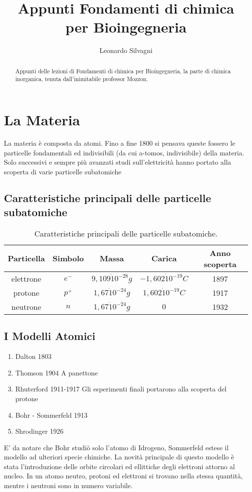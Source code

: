 \documentclass{article}
\title{Appunti Fondamenti di chimica per Bioingegneria}
\author{Leonardo Silvagni}
\begin{document}
\maketitle

\begin{abstract}
Appunti delle lezioni di Fondamenti di chimica per Bioingegneria, la parte di chimica
inorganica, tenuta dall'inimitabile professor Mozzon. 
\end{abstract}

\section{La Materia}
La materia è composta da atomi. Fino a fine 1800 si pensava queste fossero le particelle fondamentali ed indivisibili (da cui a-tomos, indivisibile) della materia. 
Solo successivi e sempre più avanzati studi sull'elettricità hanno portato alla scoperta di varie particelle subatomiche
\subsection{Caratteristiche principali delle particelle subatomiche}
\begin{table}[H]
\centering
\begin{tabular}{c|c|c|c|c}
Particella & Simbolo & Massa & Carica & Anno scoperta \\\hline
elettrone & $e^-$ & $9,109\dot 10^{-28}g$ & $-1,602\dot 10^{-19}C$ & 1897 \\
protone & $p^+$ & $1,67\dot 10^{-24}g$ & $1,602\dot 10^{-19}C$ & 1917 \\
neutrone & $n$ & $1,67\dot 10^{-24}g$ & $0$ & 1932 
\end{tabular}
\caption{\label{tab:widgets}Caratteristiche principali delle particelle subatomiche.}
\end{table}
\subsection{I Modelli Atomici}
\begin{enumerate}
\item Dalton    1803
\item Thomson   1904 A panettone
\item Rhuterford    1911-1917 Gli esperimenti finali portarono alla scoperta del protone
\item Bohr - Sommerfeld     1913
\item Shrodinger    1926
\end{enumerate}
E' da notare che Bohr studiò solo l'atomo di Idrogeno, Sommerfeld estese il modello ad ulteriori specie chimiche. La novità principale di questo modello è stata l'introduzione delle orbite circolari ed ellittiche degli elettroni attorno al nucleo. 
In un atomo neutro, protoni ed elettroni si trovano nella stessa quantità, mentre i neutroni sono in numero variabile.
\end{document}
